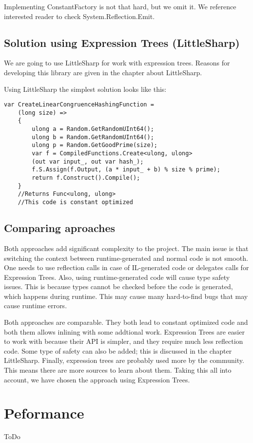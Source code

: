 Implementing ConstantFactory is not that hard, but we omit it. We reference interested reader to check System.Reflection.Emit.

\subsection{Solution using Expression Trees (LittleSharp)}
We are going to use LittleSharp for work with expression trees. Reasons for developing this library are given in the chapter about LittleSharp.

Using LittleSharp the simplest solution looks like this:
\begin{lstlisting}
var CreateLinearCongruenceHashingFunction = 
    (long size) =>
    {
        ulong a = Random.GetRandomUInt64();
        ulong b = Random.GetRandomUInt64();
        ulong p = Random.GetGoodPrime(size);
        var f = CompiledFunctions.Create<ulong, ulong>
        (out var input_, out var hash_);
        f.S.Assign(f.Output, (a * input_ + b) % size % prime);
        return f.Construct().Compile();
    }
    //Returns Func<ulong, ulong>
    //This code is constant optimized
\end{lstlisting}

\subsection{Comparing aproaches}
Both approaches add significant complexity to the project. The main issue is that switching the context between runtime-generated and normal code is not smooth. One needs to use reflection calls in case of IL-generated code or delegates calls for Expression Trees. 
Also, using runtime-generated code will cause type safety issues. This is because types cannot be checked before the code is generated, which happens during runtime. This may cause many hard-to-find bugs that may cause runtime errors.

Both approaches are comparable. They both lead to constant optimized code and both them allows inlining with some addtional work. Expression Trees are easier to work with because their API is simpler, and they require much less reflection code. Some type of safety can also be added; this is discussed in the chapter LittleSharp. Finally, expression trees are probably used more by the community. This means there are more sources to learn about them.
Taking this all into account, we have chosen the approach using Expression Trees.

\section{Peformance}

ToDo 


